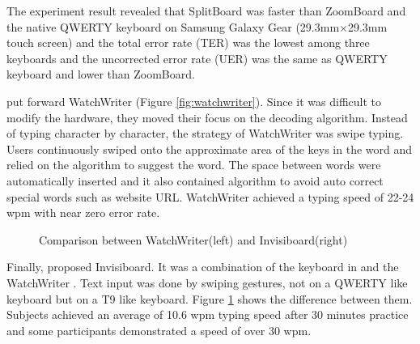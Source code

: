 \documentclass[11pt]{article}
\begin{document}
The experiment result revealed that SplitBoard was faster than ZoomBoard and the native QWERTY keyboard on Samsung Galaxy Gear (29.3mm$\times$29.3mm touch screen) and the total error rate (TER) was the lowest among three keyboards and the uncorrected error rate (UER) was the same as QWERTY keyboard and lower than ZoomBoard.

\citet{10.1145/2858036.2858242} put forward WatchWriter (Figure \ref{fig:watchwriter}). Since it was difficult to modify the hardware, they moved their focus on the decoding algorithm. Instead of typing character by character, the strategy of WatchWriter was swipe typing. Users continuously swiped onto the approximate area of the keys in the word and relied on the algorithm to suggest the word. The space between words were automatically inserted and it also contained algorithm to avoid auto correct special words such as website URL. WatchWriter achieved a typing speed of 22-24 wpm with near zero error rate.

\begin{figure}[H]
\centering
{}\hfill
{}\hfill
\caption{Comparison between WatchWriter(left) and Invisiboard(right)} \label{fig:watchcomparison}
\end{figure}

Finally, \citet{10.1145/2935334.2935360} proposed Invisiboard. It was a combination of the keyboard in \citet{6926662} and the WatchWriter \citep{10.1145/2858036.2858242}. Text input was done by swiping gestures, not on a QWERTY like keyboard but on a T9 like keyboard. Figure \ref{fig:watchcomparison} shows the difference between them. Subjects achieved an average of 10.6 wpm typing speed after 30 minutes practice and some participants demonstrated a speed of over 30 wpm.
\end{document}
